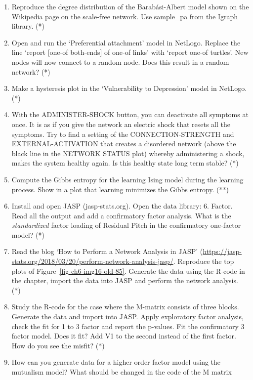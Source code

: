 \documentclass[
  letterpaper,
]{scrbook}
\begin{document}
\begin{enumerate}
\def\labelenumi{\arabic{enumi})}
\item
  Reproduce the degree distribution of the Barabási-Albert model shown
  on the Wikipedia page on the scale-free network. Use sample\_pa from
  the Igraph library. (*)
\item
  Open and run the `Preferential attachment' model in NetLogo. Replace
  the line `report {[}one-of both-ends{]} of one-of links' with `report
  one-of turtles'. New nodes will now connect to a random node. Does
  this result in a random network? (*)
\item
  Make a hysteresis plot in the `Vulnerability to Depression' model in
  NetLogo. (*)
\item
  With the ADMINISTER-SHOCK button, you can deactivate all symptoms at
  once. It is as if you give the network an electric shock that resets
  all the symptoms. Try to find a setting of the CONNECTION-STRENGTH and
  EXTERNAL-ACTIVATION that creates a disordered network (above the black
  line in the NETWORK STATUS plot) whereby administering a shock, makes
  the system healthy again. Is this healthy state long term stable? (*)
\item
  Compute the Gibbs entropy for the learning Ising model during the
  learning process. Show in a plot that learning minimizes the Gibbs
  entropy. (**)
\item
  Install and open JASP (jasp-stats.org). Open the data library: 6.
  Factor. Read all the output and add a confirmatory factor analysis.
  What is the \emph{standardized} factor loading of Residual Pitch in
  the confirmatory one-factor model? (*)
\item
  Read the blog `How to Perform a Network Analysis in JASP'
  (\url{https://jasp-stats.org/2018/03/20/perform-network-analysis-jasp/}.
  Reproduce the top plots of Figure~\ref{fig-ch6-img16-old-85}. Generate
  the data using the R-code in the chapter, import the data into JASP
  and perform the network analysis. (*)
\item
  Study the R-code for the case where the M-matrix consists of three
  blocks. Generate the data and import into JASP. Apply exploratory
  factor analysis, check the fit for 1 to 3 factor and report the
  p-values. Fit the confirmatory 3 factor model. Does it fit? Add V1 to
  the second instead of the first factor. How do you see the misfit? (*)
\item
  How can you generate data for a higher order factor model using the
  mutualism model? What should be changed in the code of the M matrix

\end{enumerate}
\end{document}
